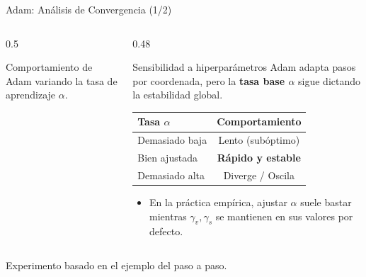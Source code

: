 \begin{frame}{Adam: Análisis de Convergencia (1/2)}
\begin{columns}[T]
\begin{column}{0.5\textwidth}
            {\tiny Comportamiento de Adam variando la tasa de aprendizaje $\alpha$.\par}
        \end{column}
        \scriptsize
        \begin{column}{0.48\textwidth}
            \begin{alertblock}{Sensibilidad a hiperparámetros}
                \footnotesize
                Adam adapta pasos por coordenada, pero la \textbf{tasa base $\alpha$} sigue dictando la estabilidad global.
            \end{alertblock}
            \centering
            \small
            \vspace{0.5em}
            \scriptsize
            \begin{tabular}{l c}
                \toprule
                Tasa $\alpha$ & Comportamiento \\
                \midrule
                Demasiado baja & Lento (subóptimo) \\
                Bien ajustada & \textbf{Rápido y estable} \\
                Demasiado alta & Diverge / Oscila \\
                \bottomrule
            \end{tabular}
            \vspace{1em}
            \begin{itemize}
                \footnotesize
                \item[$-$] En la práctica empírica, ajustar $\alpha$ suele bastar mientras $\gamma_v, \gamma_s$ se mantienen en sus valores por defecto.
            \end{itemize}
        \end{column}
    \end{columns}
    \vfill{\scriptsize{Experimento basado en el ejemplo del paso a paso.}}
\end{frame}

